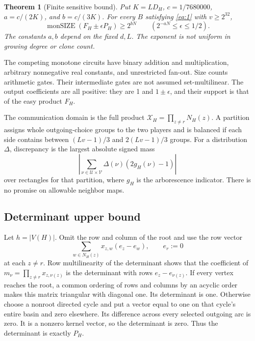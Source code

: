 \documentclass[11pt]{article}
\newtheorem{theorem}{Theorem}[section]
\theoremstyle{definition}
\theoremstyle{remark}
\numberwithin{equation}{section}
\begin{document}
\begin{theorem}[Finite sensitive bound]\label{thm:finite} Put \(K=LD_H\), \(c=1/7680000\),
\(a=c/(2K)\), and \(b=c/(3K)\). For every \(B\) satisfying \eqref{eq:1}
with \(v\ge2^{32}\),
\begin{equation}\label{eq:3}
\operatorname{monSIZE}(F_H\pm\epsilon P_H)\ge2^{bN}
                        \qquad(2^{-aN}\le\epsilon\le1/2).
\end{equation}
The constants \(a,b\) depend on the fixed \(d,L\).
The exponent is not uniform in growing degree or clone count.
\end{theorem}

The competing monotone circuits have binary addition and multiplication,
arbitrary nonnegative real constants, and unrestricted fan-out. Size
counts arithmetic gates. Their intermediate gates are not assumed
set-multilinear. The output coefficients are all positive: they are
1 and \(1\pm\epsilon\), and their support is that of the easy product
\(F_H\).

The communication domain is the full product
\(\mathcal X_H=\prod_{z\ne r}N_H(z)\). A partition assigns whole
outgoing-choice groups to the two players and is balanced if each
side contains between \((Lv-1)/3\) and \(2(Lv-1)/3\) groups.
For a distribution \(\Delta\), discrepancy is the largest absolute
signed mass
\[
     \left|\sum_{\nu\in\mathcal U\times\mathcal V}
                       \Delta(\nu)(2g_H(\nu)-1)\right|
\]
over rectangles for that partition, where \(g_H\) is the arborescence
indicator. There is no promise on allowable neighbor maps.

\subsection{Determinant upper bound}\label{sub:determinant}

Let \(h=|V(H)|\). Omit the row and column of the root and use the
row vector
\[
       \sum_{w\in N_H(z)}x_{z,w}(e_z-e_w),\qquad e_r:=0
\]
at each \(z\ne r\). Row multilinearity of the determinant shows
that the coefficient of \(m_\nu=\prod_{z\ne r}x_{z,\nu(z)}\)
is the determinant with rows \(e_z-e_{\nu(z)}\).
If every vertex reaches the root, a common ordering of rows and
columns by an acyclic order makes this matrix triangular with
diagonal one. Its determinant is one.
Otherwise choose a nonroot directed cycle and put a vector equal
to one on that cycle's entire basin and zero elsewhere. Its
difference across every selected outgoing arc is zero. It is a
nonzero kernel vector, so the determinant is zero.
Thus the determinant is exactly \(P_H\).
\end{document}
